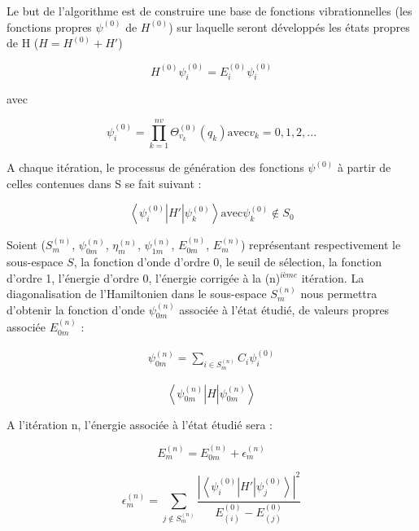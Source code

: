 Le but de l'algorithme est de construire une base de fonctions vibrationnelles (les fonctions propres $\psi^{(0)}$ de $H^{(0)}$) sur laquelle seront développés les états propres de H ($H=H^{(0)} + H'$)

\begin{equation}
H^{(0)} \psi^{(0)}_{i} = E^{(0)}_{i}  \psi^{(0)}_{i} 
\end{equation}

avec

\begin{equation}
\psi^{(0)}_{i} = \prod^{nv}_{k=1} \Theta^{(0)}_{v_k}(q_k) \text{avec} v_k = 0,1,2, ...
\end{equation}

A chaque itération, le processus de génération des fonctions $\psi^{(0)}$ à partir de celles contenues dans S se fait suivant :

\begin{equation} 
      \left\langle \psi^{(0)}_{i} \right \vert H' \left  \vert \psi^{(0)}_{k} \right\rangle \text{avec}  \psi^{(0)}_{k} \notin S_0
\end{equation}

Soient ($S^{(n)}_{m}$, $\psi^{(n)}_{0m}$, $\eta^{(n)}_{m}$, $\psi^{(n)}_{1m}$, $E^{(n)}_{0m}$, $E^{(n)}_{m}$) représentant respectivement le sous-espace $S$, la fonction d'onde d'ordre 0, le seuil de sélection, la fonction d'ordre 1, l'énergie d'ordre 0, l'énergie corrigée à la (n)$^{ième}$ itération. La diagonalisation de l'Hamiltonien dans le sous-espace $S^{(n)}_{m}$ nous permettra d'obtenir la fonction d'onde $\psi^{(n)}_{0m}$ associée à l'état étudié, de valeurs propres associée $E^{(n)}_{0m}$ :


\begin{align} \label{dev}
	\psi^{(n)}_{0m} =  \sum_{i \in  S^{(n)}_{m}}  C_i \psi^{(0)}_{i}
\end{align}

\begin{equation}
	 \left\langle \psi^{(n)}_{0m} \right| H \left| \psi^{(n)}_{0m} \right\rangle 
\end{equation}

A l'itération n, l'énergie associée à l'état étudié sera :

\begin{equation}
	  E^{(n)}_{m} = E^{(n)}_{0m} + \epsilon^{(n)}_{m}
\end{equation}

\begin{equation}
	\epsilon^{(n)}_{m} =  \sum_{j \notin  S^{(n)}_{m}}  \frac{\left| \left\langle \psi^{(0)}_{i} \right| H' \left| \psi^{(0)}_{j} \right\rangle \right|^2}       {E^{(0)}_{(i)} - E^{(0)}_{(j)}}
\end{equation}

